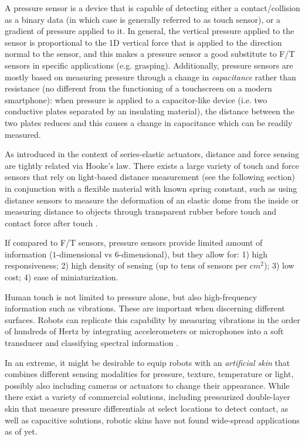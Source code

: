 A pressure sensor is a device that is capable of detecting either a contact/collision as a binary data (in which case is generally referred to as touch sensor), or a gradient of pressure applied to it.
In general, the vertical pressure applied to the sensor is proportional to the 1D vertical force that is applied to the direction normal to the sensor, and this makes a pressure sensor a good substitute to F/T sensors in specific applications (e.g. grasping).
Additionally, pressure sensors are mostly based on measuring pressure through a change in \textsl{capacitance} rather than resistance (no different from the functioning of a touchscreen on a modern smartphone): when pressure is applied to a capacitor-like device (i.e. two conductive plates separated by an insulating material), the distance between the two plates reduces and this causes a change in capacitance which can be readily measured.

As introduced in the context of series-elastic actuators, distance and force sensing are tightly related via Hooke's law. There exists a large variety of touch and force sensors that rely on light-based distance measurement (see the following section) in conjunction with a flexible material with known spring constant, such as using distance sensors to measure the deformation of an elastic dome from the inside \cite{youssefian2013contact} or measuring distance to objects through transparent rubber before touch and contact force after touch \cite{patel2018integrated}.

If compared to F/T sensors, pressure sensors provide limited amount of information ($1$-dimensional vs $6$-dimensional), but they allow for: 1) high responsiveness; 2) high density of sensing (up to tens of sensors per $cm^2$); 3) low cost; 4) ease of miniaturization.

Human touch is not limited to pressure alone, but also high-frequency information such as vibrations. These are important when discerning different surfaces. Robots can replicate this capability by measuring vibrations in the order of hundreds of Hertz by integrating accelerometers or microphones into a soft transducer and classifying spectral information \cite{hughes2015texture}.

In an extreme, it might be desirable to equip robots with an \emph{artificial skin} that combines different sensing modalities for pressure, texture, temperature or light, possibly also including cameras or actuators to change their appearance. While there exist a variety of commercial solutions, including pressurized double-layer skin that measure pressure differentials at select locations to detect contact, as well as capacitive solutions, robotic skins have not found wide-spread applications as of yet.  

